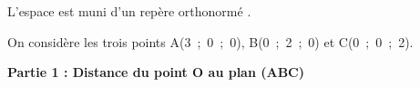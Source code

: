 \medskip

L'espace est muni d'un repère orthonormé \Oijk.

On considère les trois points A(3~;~0~;~0), B(0~;~2~;~0) et C(0~;~0~;~2).





















\bigskip

\textbf{Partie 1 : Distance du point O au plan (ABC)}

\medskip

